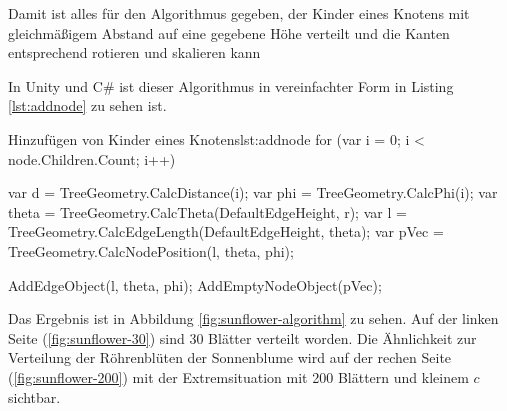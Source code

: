 Damit ist alles für den Algorithmus gegeben, der Kinder eines Knotens mit gleichmäßigem Abstand auf eine gegebene Höhe verteilt und die Kanten entsprechend rotieren und skalieren kann

In Unity und C\# ist dieser Algorithmus in vereinfachter Form in Listing \ref{lst:addnode} zu sehen ist.

\begin{codesnippet}{Hinzufügen von Kinder eines Knotens}{lst:addnode}
for (var i = 0; i < node.Children.Count; i++)
{
    var d = TreeGeometry.CalcDistance(i);
    var phi = TreeGeometry.CalcPhi(i);
    var theta = TreeGeometry.CalcTheta(DefaultEdgeHeight, r);
    var l = TreeGeometry.CalcEdgeLength(DefaultEdgeHeight, theta);
    var pVec = TreeGeometry.CalcNodePosition(l, theta, phi);
  
    AddEdgeObject(l, theta, phi);
    AddEmptyNodeObject(pVec);
}
\end{codesnippet}

Das Ergebnis ist in Abbildung \ref{fig:sunflower-algorithm} zu sehen. Auf der linken Seite (\ref{fig:sunflower-30}) sind 30 Blätter verteilt worden. Die Ähnlichkeit zur Verteilung der Röhrenblüten der Sonnenblume wird auf der rechen Seite (\ref{fig:sunflower-200}) mit der Extremsituation mit 200 Blättern und kleinem $c$ sichtbar.

